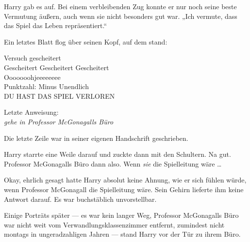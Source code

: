 Harry gab es auf. Bei einem verbleibenden Zug konnte er nur noch seine beste Vermutung äußern, auch wenn sie nicht besonders gut war.
„Ich vermute, dass das Spiel das Leben repräsentiert.“

Ein letztes Blatt flog über seinen Kopf, auf dem stand:

\begin{writtenNote}
%
Versuch gescheitert\\
Gescheitert Gescheitert Gescheitert\\
Ooooooohjeeeeeeee\\
Punktzahl: Minus Unendlich\\
\MakeUppercase{Du hast das Spiel verloren}

Letzte Anweisung:\\
\emph{gehe in Professor McGonagalls Büro}
\end{writtenNote}

Die letzte Zeile war in seiner eigenen Handschrift geschrieben.

Harry starrte eine Weile darauf und zuckte dann mit den Schultern. Na gut. Professor McGonagalls Büro dann also. Wenn \emph{sie} die Spielleitung wäre …

Okay, ehrlich gesagt hatte Harry absolut keine Ahnung, wie er sich fühlen würde, wenn Professor McGonagall die Spielleitung wäre. Sein Gehirn lieferte ihm keine Antwort darauf. Es war buchstäblich unvorstellbar.

Einige Porträts später — es war kein langer Weg, Professor McGonagalls Büro war nicht weit vom Verwandlungsklassenzimmer entfernt, zumindest nicht montags in ungeradzahligen Jahren — stand Harry vor der Tür zu ihrem Büro.

